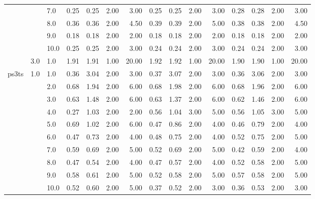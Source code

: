 \begin{tabular}{lllrrrrrrrrrrrr}
      &     & 7.0  &       0.25 &      0.25 & 2.00 &   3.00 &       0.25 &      0.25 & 2.00 &   3.00 &       0.28 &      0.28 & 2.00 &   3.00 \\
      &     & 8.0  &       0.36 &      0.36 & 2.00 &   4.50 &       0.39 &      0.39 & 2.00 &   5.00 &       0.38 &      0.38 & 2.00 &   4.50 \\
      &     & 9.0  &       0.18 &      0.18 & 2.00 &   2.00 &       0.18 &      0.18 & 2.00 &   2.00 &       0.18 &      0.18 & 2.00 &   2.00 \\
      &     & 10.0 &       0.25 &      0.25 & 2.00 &   3.00 &       0.24 &      0.24 & 2.00 &   3.00 &       0.24 &      0.24 & 2.00 &   3.00 \\
      & 3.0 & 1.0  &       1.91 &      1.91 & 1.00 &  20.00 &       1.92 &      1.92 & 1.00 &  20.00 &       1.90 &      1.90 & 1.00 &  20.00 \\
ps3ts & 1.0 & 1.0  &       0.36 &      3.04 & 2.00 &   3.00 &       0.37 &      3.07 & 2.00 &   3.00 &       0.36 &      3.06 & 2.00 &   3.00 \\
      &     & 2.0  &       0.68 &      1.94 & 2.00 &   6.00 &       0.68 &      1.98 & 2.00 &   6.00 &       0.68 &      1.96 & 2.00 &   6.00 \\
      &     & 3.0  &       0.63 &      1.48 & 2.00 &   6.00 &       0.63 &      1.37 & 2.00 &   6.00 &       0.62 &      1.46 & 2.00 &   6.00 \\
      &     & 4.0  &       0.27 &      1.03 & 2.00 &   2.00 &       0.56 &      1.04 & 3.00 &   5.00 &       0.56 &      1.05 & 3.00 &   5.00 \\
      &     & 5.0  &       0.69 &      1.02 & 2.00 &   6.00 &       0.47 &      0.86 & 2.00 &   4.00 &       0.46 &      0.79 & 2.00 &   4.00 \\
      &     & 6.0  &       0.47 &      0.73 & 2.00 &   4.00 &       0.48 &      0.75 & 2.00 &   4.00 &       0.52 &      0.75 & 2.00 &   5.00 \\
      &     & 7.0  &       0.59 &      0.69 & 2.00 &   5.00 &       0.52 &      0.69 & 2.00 &   5.00 &       0.42 &      0.59 & 2.00 &   4.00 \\
      &     & 8.0  &       0.47 &      0.54 & 2.00 &   4.00 &       0.47 &      0.57 & 2.00 &   4.00 &       0.52 &      0.58 & 2.00 &   5.00 \\
      &     & 9.0  &       0.58 &      0.61 & 2.00 &   5.00 &       0.52 &      0.58 & 2.00 &   5.00 &       0.57 &      0.58 & 2.00 &   5.00 \\
      &     & 10.0 &       0.52 &      0.60 & 2.00 &   5.00 &       0.37 &      0.52 & 2.00 &   3.00 &       0.36 &      0.53 & 2.00 &   3.00 \\

\end{tabular}

